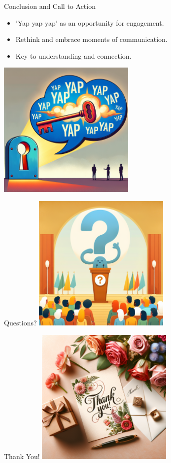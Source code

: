 \documentclass{beamer}
\begin{document}
\begin{frame}{Conclusion and Call to Action}
\begin{itemize}
    \item 'Yap yap yap' as an opportunity for engagement.
    \item Rethink and embrace moments of communication.
    \item Key to understanding and connection.
\end{itemize}
\centering
\includegraphics[width=0.5\textwidth]{./images/conclusion.png}
\end{frame}

\begin{frame}{Questions?}
\centering
\includegraphics[width=0.5\textwidth]{./images/questions.png}
\end{frame}

\begin{frame}{Thank You!}
\centering
\includegraphics[width=0.5\textwidth]{./images/thankyou.png}
\end{frame}
\end{document}
